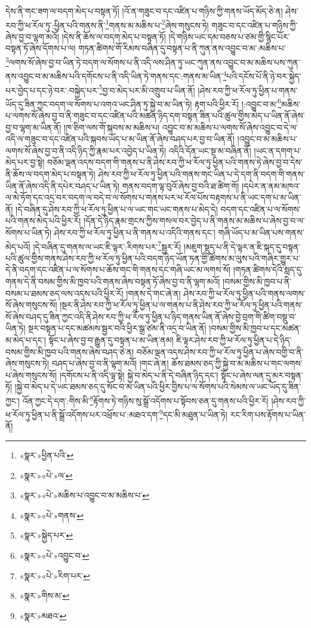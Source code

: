 དེས་ནི་གང་ཟག་ལ་བདག་མེད་པ་བསྟན་ཏོ། །འོ་ན་གཟུང་བ་དང་འཛིན་པ་གཉིས་ཀྱི་གནས་ཡོད་མོད་ཅེ་ན། ཤེས་རབ་ཀྱི་ཕ་རོལ་ཏུ་:ཕྱིན་པའི་གནས་ནི་\footnote{«སྣར་»ཕྱིན་པའི་}གནས་མ་མཆིས་པ་\footnote{«སྣར་»«པེ་»ལ་}ཞེས་གསུངས་ཏེ། གཟུང་བ་དང་འཛིན་པ་གཉིས་ཀྱི་ཞེས་བྱ་བ་ལྷག་མའོ། །དེས་ནི་ཆོས་ལ་བདག་མེད་པ་བསྟན་ཏོ། །དེ་གཉིས་ཡང་དམ་བཅས་པ་ཙམ་གྱི་སྙིང་པོར་བསྟན་ཏོ་ཞེས་དོགས་པ་ལ། གཏན་ཚིགས་གོ་རིམས་བཞིན་དུ་བསྟན་པ་ནི་ཀུན་ནས་འབྱུང་བ་མ་:མཆིས་པ་\footnote{«སྣར་»«པེ་»མཆིས་པ་འབྱུང་བ་མ་མཆིས་པ་}ལགས་སོ་ཞེས་བྱ་བ་ཡིན་ཏེ་བདག་ལ་སོགས་པ་ནི་འདི་ལས་ཤིན་ཏུ་ཡང་ཀུན་ནས་འབྱུང་བ་མ་མཆིས་པས་ཀུན་ནས་འབྱུང་བ་མ་མཆིས་པའི་དགོངས་པ་ནི་འདི་ཡིན་ཏེ་གནས་དང་:གནས་མ་ཡིན་\footnote{«སྣར་»«པེ་»གནས་}པའི་དངོས་པོ་ནི་ཉེ་བར་སྐྱེད་པར་བྱེད་པ་དང་ཉེ་བར་:བསྐྱེད་པར་\footnote{«སྣར་»སྐྱེད་པར་}བྱ་བ་མེད་པར་མི་འགྲུབ་པ་ཡིན་ནོ། །ཤེས་རབ་ཀྱི་ཕ་རོལ་ཏུ་ཕྱིན་པ་གནས་ཡོད་དུ་ཟིན་ཀྱང་བདག་ལ་སོགས་པ་འགའ་ཡང་ཤིན་ཏུ་སྐྱེ་བ་མ་ཡིན་ཏེ། རྟག་པའི་ཕྱིར་རོ། །:འབྱུང་བ་མ་\footnote{«སྣར་»«པེ་»འབྱུང་བ་}མཆིས་པ་ལགས་སོ་ཞེས་བྱ་བ་ནི་གཟུང་བ་དང་འཛིན་པའི་མཚན་ཉིད་དག་བསྟན་ཟིན་པའི་ཚུལ་གྱིས་མེད་པ་ཡིན་ནོ་ཞེས་བྱ་བ་ལྷག་མ་ཡིན་ནོ། །ཁ་ཅིག་ལས་གོ་སྐབས་མ་མཆིས་པ། འབྱུང་བ་མ་མཆིས་པ་ལགས་སོ་ཞེས་འབྱུང་བ་དེ་ལ་འདི་ལ་གཟུང་བ་དང་འཛིན་པའི་སྐབས་ཡོད་པ་མ་ཡིན་ནོ་ཞེས་བཤད་པར་བྱ་བ་ཡིན་ནོ། །འབྱུང་བ་མ་མཆིས་པ་ལགས་སོ་ཞེས་བྱ་བ་ནི་འདི་ཉིད་ཀྱི་རྣམ་པར་འབྱེད་པ་ཡིན་ཏེ། འདིའི་དོན་ཡང་སྔ་མ་བཞིན་ནོ། །ཡང་ན་དགག་པ་མེད་པར་བྱ་སྟེ། བཅོམ་ལྡན་འདས་བདག་གི་གནས་པ་ནི་ཤེས་རབ་ཀྱི་ཕ་རོལ་ཏུ་ཕྱིན་པའི་གནས་ཏེ་ཞེས་བྱ་བ་དེས་ནི་ཆོས་ལ་བདག་མེད་པ་བསྟན་ཏེ། ཤེས་རབ་ཀྱི་ཕ་རོལ་ཏུ་ཕྱིན་པའི་གནས་གང་ཡིན་པ་དེ་དག་ནི་བདག་གི་གནས་ཡིན་ནོ་ཞེས་འདི་ནི་དཔེར་བཤད་པ་ཡིན་ཏེ། གནས་བདག་ལྟ་བུའོ་ཞེས་བྱ་བའི་ཐ་ཚིག་གོ། །དཔེར་ན་ནམ་མཁའ་ལ་མེ་ཏོག་དང་འདྲ་བར་བདག་ལ་བདེ་བ་ལ་སོགས་པ་གནས་པར་ཕ་རོལ་པོས་བརྟགས་པ་ནི་ཡང་དག་པ་མ་ཡིན་ནོ། །དེ་བཞིན་དུ་ཤེས་རབ་ཀྱི་ཕ་རོལ་ཏུ་ཕྱིན་པ་ལ་ཡང་གང་ཡང་གནས་པ་མེད་དེ། བདག་དང་འཛིན་པ་ལ་སོགས་པའི་གནས་མེད་པའི་ཕྱིར་རོ། །དོན་དེ་ཉིད་རྣམ་གྲངས་ཀྱིས་གསལ་བར་བྱེད་པ་ནི་གནས་མ་མཆིས་པ་ཞེས་བྱ་བ་ལ་སོགས་པ་ཡིན་ཏེ། ཤེས་རབ་ཀྱི་ཕ་རོལ་ཏུ་ཕྱིན་པ་ནི་གནས་པ་འདིའི་གནས་དང་། གཞི་ཡོད་པ་མ་ཡིན་པས་གནས་མེད་པའོ། །དེ་བཞིན་དུ་གནས་ལ་ཡང་ཇི་ལྟར་:རིགས་པར་\footnote{«སྣར་»«པེ་»རིག་པར་}སྦྱར་རོ། །མཇུག་སྡུད་པ་ནི་དེ་ལྟར་ན་ཇི་སྐད་དུ་བསྟན་པའི་ཚུལ་གྱིས་གནས་ཤེས་རབ་ཀྱི་ཕ་རོལ་ཏུ་ཕྱིན་པའི་བདག་ཉིད་ཡོན་ཏན་གྱི་ཚོགས་མ་ལུས་པའི་གཞིར་གྱུར་པ་དེ་ནི་བདག་དང་འཛིན་པ་ལ་སོགས་པ་ཆོས་གང་གི་གནས་དང་གཞི་ཡང་མ་ལགས་སོ། །གཏན་ཚིགས་དེའི་སླད་དུ་གནས་དེ་ནི་བསམ་གྱིས་མི་ཁྱབ་པའི་གནས་ཞེས་བསྟན་ཏོ་ཞེས་བྱ་བ་ནི་ལྷག་མའོ། །བསམ་གྱིས་མི་ཁྱབ་པ་ནི་བསམ་པ་ཐམས་ཅད་ལས་འདས་པའི་ཕྱིར་རོ། །གནས་དེ་གང་ཞེ་ན། ཤེས་རབ་ཀྱི་ཕ་རོལ་ཏུ་ཕྱིན་པའི་གནས་ལགས་སོ་ཞེས་གསུངས་སོ། །སྔར་ནི་ཤེས་རབ་ཀྱི་ཕ་རོལ་ཏུ་ཕྱིན་པ་ལ་གནས་པ་ནི་ཤེས་རབ་ཀྱི་ཕ་རོལ་ཏུ་ཕྱིན་པའི་གནས་སོ་ཞེས་བཤད་དུ་ཟིན་ཀྱང་འདི་ནི་ཤེས་རབ་ཀྱི་ཕ་རོལ་ཏུ་ཕྱིན་པ་ཉིད་གནས་ཡིན་ནོ་ཞེས་བྱེ་བྲག་གི་ཚིག་བསྡུ་བ་ཡིན་ཏེ། སྔར་བསྟན་པ་དང་མཚམས་སྦྱར་བའི་ཕྱིར་སྒྲ་ཙམ་ནི་འདྲ་བ་ཡིན་ནོ། །བསམ་གྱིས་མི་ཁྱབ་པ་དང་མཚན་མ་མེད་པ་དང་། སྟོང་པ་ཞེས་བྱ་བ་རྒྱུན་དུ་བསྟན་པ་མ་ཡིན་ནམ། ཇི་ལྟར་ཤེས་རབ་ཀྱི་ཕ་རོལ་ཏུ་ཕྱིན་པ་དེ་ཉིད་བསམ་གྱིས་མི་ཁྱབ་པའི་གནས་ཞེས་བཤད་ཅེ་ན། བཅོམ་ལྡན་འདས་ཤེས་རབ་ཀྱི་ཕ་རོལ་ཏུ་ཕྱིན་པ་ཞེས་བགྱི་བ་ནི་ཞེས་གསུངས་ཏེ། བཤད་པ་ཞེས་བྱ་བ་ནི་ལྷག་མའོ། །གང་ཞེ་ན། ཆོས་ཐམས་ཅད་ཀྱི་སྐྱེ་བ་མ་མཆིས་པ་གང་ལགས་པ་ཞེས་གསུངས་སོ། །དགོངས་པ་ནི་འདི་ལྟ་སྟེ། སྐྱེ་བ་མེད་པ་ནི་དེ་བཞིན་ཉིད་དང་། སྟོང་པ་ཞེས་ལན་དུ་མར་བསྟན་ཏོ། །སྐྱེ་བ་མེད་པ་དེ་ཡང་ཐམས་ཅད་དུ་སོང་བ་མ་ཡིན་པའི་ཕྱིར་བྱིས་པ་ལ་སོགས་པའི་སེམས་ལ་ཡང་ཡོད་དུ་ཟིན་ཀྱང་། འོན་ཀྱང་དེ་དག་:གིས་མི་\footnote{«སྣར་»གིས་མ་}རྟོགས་ཏེ་གཉིས་སུ་སྒྲོ་འདོགས་པ་སྟོབས་ཅན་དུ་གནས་པའི་ཕྱིར་རོ། །ཤེས་རབ་ཀྱི་ཕ་རོལ་ཏུ་ཕྱིན་པ་ནི་སྒྲོ་འདོགས་པར་འཕྲོས་པ་:མཐའ་དག་\footnote{«སྣར་»མཐའ་}དང་མི་མཐུན་པ་ཡིན་ཏེ། རང་རིག་པས་རྟོགས་པ་ཡིན་ནོ། 